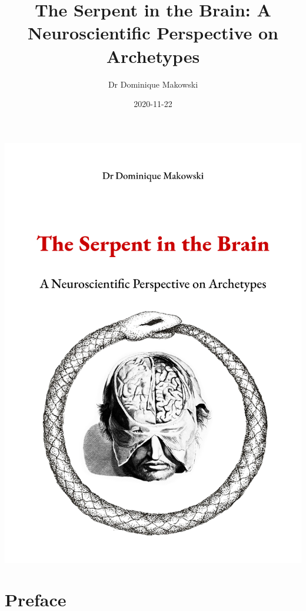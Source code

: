 \documentclass[
]{book}
\title{The Serpent in the Brain: A Neuroscientific Perspective on Archetypes}
\author{Dr Dominique Makowski}
\date{2020-11-22}
\let\oldmaketitle\maketitle
\begin{document}
\maketitle

\thispagestyle{empty}
\begin{center}
\includegraphics[width=\textwidth]{img/cover.png}
\end{center}

\let\maketitle\oldmaketitle
\maketitle

{
\hypersetup{linkcolor=}
\setcounter{tocdepth}{1}
\tableofcontents
}
\listoftables
\listoffigures
\hypertarget{preface}{%
\chapter*{Preface}\label{preface}}
\end{document}
